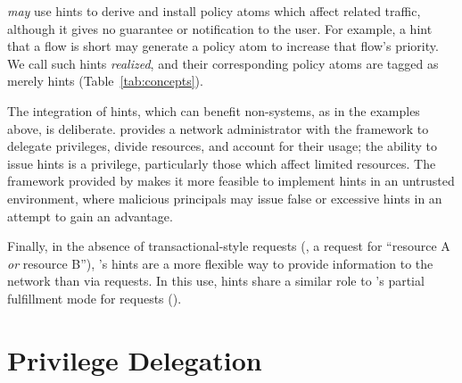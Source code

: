\sys \emph{may} use hints to derive and install policy atoms which affect
related traffic, although it gives no guarantee or notification to the user. 
For example, a hint that a flow is short may generate
a policy atom to increase that flow's priority. We call such hints
\emph{realized}, and their corresponding policy atoms are tagged as
merely hints (\cf Table~\ref{tab:concepts}).

The integration of hints, which can benefit non-\sys systems, as in
the examples above, is deliberate. \sys provides a network
administrator with the framework to delegate privileges, divide
resources, and account for their usage; the ability to issue hints is
a privilege, particularly those which affect limited resources.  The
framework provided by \sys makes it more feasible to implement hints
in an untrusted environment, where malicious principals may issue
false or excessive hints in an attempt to gain an advantage.

Finally, in the absence of transactional-style requests (\eg, a
request for ``resource A \emph{or} resource B''), \sys's hints are a
more flexible way to provide information to the network than via
requests. In this use, hints share a similar role to \sys's partial
fulfillment mode for requests ().

\chapter{Privilege Delegation}
\label{sec:delegation}

